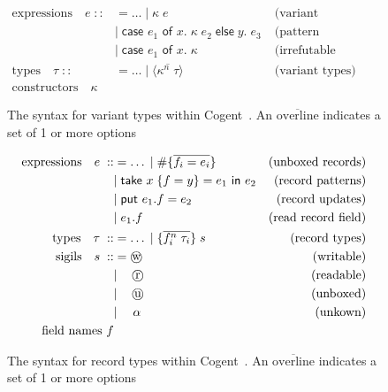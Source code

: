 \begin{figure}
    \centering

    \begin{align*}
        \text{expressions}\quad e\; 
            ::&= \dots\; |\; \kappa\; e & \text{(variant constructor)} \\
              &|\; \textsf{case } e_1 \textsf{ of } x.\; \kappa\; e_2\;
                   \textsf{else}\; y.\; e_3 \; & \text{(pattern matching)} \\
              &|\; \textsf{case } e_1 \textsf{ of } x.\; \kappa\; 
                   & \text{(irrefutable match)} \\
        \text{types}\quad \tau\;
            ::&= \dots\; |\; \langle \overline{\kappa^n\; \tau} \rangle & \text{(variant types)} \\
        \text{constructors}\quad \kappa
    \end{align*}

    \caption{The syntax for variant types within Cogent~\citep{LiamThesis}. An $\overline{\text{overline}}$ indicates a set of 1 or more options}
    \label{fig:variantGrammar}
\end{figure}

\begin{figure}
    \centering
    \begin{align*}
        \text{expressions}\quad e\; 
            ::&= \dots\; |\; \#\{\overline{f_i = e_i}\} & \text{(unboxed records)} \\
              &|\; \textsf{take } x\; \{ f = y\} = e_1 \textsf{ in } e_2 & \text{(record patterns)} \\
              &|\; \textsf{put } e_1.f = e_2 & \text{(record updates)} \\
              &|\; e_1.f & \text{(read record field)} \\
        \text{types}\quad \tau\;
            ::&= \dots\; |\; \{ \overline{f_i^n\; \tau_i} \}\; s & \text{(record types)} \\
        \text{sigils}\quad s\;
            ::&= \text{\textcircled{w}} & \text{(writable)} \\
            &|\quad\, \text{\textcircled{r}} & \text{(readable)}\\
            &|\quad\, \text{\textcircled{u}} & \text{(unboxed)}\\
            &|\quad\; \alpha & \text{(unkown)}\\
        \text{field names } f
    \end{align*}
    \caption{The syntax for record types within Cogent~\citep{ICFPCogent}. An $\overline{\text{overline}}$ indicates a set of 1 or more options}
    \label{fig:recordGrammar}
\end{figure}

